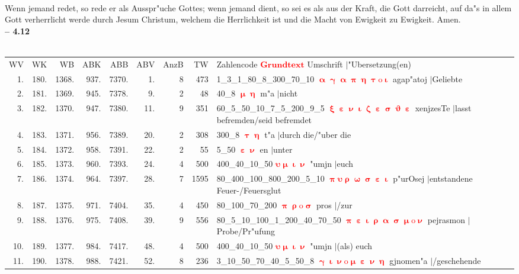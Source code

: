 \documentclass[a4paper,10pt,landscape]{article}
\begin{document}
\\
Wenn jemand redet, so rede er als Ausspr"uche Gottes; wenn jemand dient, so sei es als aus der Kraft, die Gott darreicht, auf da"s in allem Gott verherrlicht werde durch Jesum Christum, welchem die Herrlichkeit ist und die Macht von Ewigkeit zu Ewigkeit. Amen.\\
\newpage 
{\bf -- 4.12}\\
\medskip \\
\begin{tabular}{rrrrrrrrp{120mm}}
WV&WK&WB&ABK&ABB&ABV&AnzB&TW&Zahlencode \textcolor{red}{$\boldsymbol{Grundtext}$} Umschrift $|$"Ubersetzung(en)\\
1.&180.&1368.&937.&7370.&1.&8&473&1\_3\_1\_80\_8\_300\_70\_10 \textcolor{red}{$\boldsymbol{\upalpha\upgamma\upalpha\uppi\upeta\uptau\mathrm{o}\upiota}$} agap"atoj $|$Geliebte\\
2.&181.&1369.&945.&7378.&9.&2&48&40\_8 \textcolor{red}{$\boldsymbol{\upmu\upeta}$} m"a $|$nicht\\
3.&182.&1370.&947.&7380.&11.&9&351&60\_5\_50\_10\_7\_5\_200\_9\_5 \textcolor{red}{$\boldsymbol{\upxi\upepsilon\upnu\upiota\upzeta\upepsilon\upsigma\upvartheta\upepsilon}$} xenjzesTe $|$lasst befremden/seid befremdet\\
4.&183.&1371.&956.&7389.&20.&2&308&300\_8 \textcolor{red}{$\boldsymbol{\uptau\upeta}$} t"a $|$durch die/"uber die\\
5.&184.&1372.&958.&7391.&22.&2&55&5\_50 \textcolor{red}{$\boldsymbol{\upepsilon\upnu}$} en $|$unter\\
6.&185.&1373.&960.&7393.&24.&4&500&400\_40\_10\_50 \textcolor{red}{$\boldsymbol{\upsilon\upmu\upiota\upnu}$} "umjn $|$euch\\
7.&186.&1374.&964.&7397.&28.&7&1595&80\_400\_100\_800\_200\_5\_10 \textcolor{red}{$\boldsymbol{\uppi\upsilon\uprho\upomega\upsigma\upepsilon\upiota}$} p"urOsej $|$entstandene Feuer-/Feuersglut\\
8.&187.&1375.&971.&7404.&35.&4&450&80\_100\_70\_200 \textcolor{red}{$\boldsymbol{\uppi\uprho\mathrm{o}\upsigma}$} pros $|$/zur\\
9.&188.&1376.&975.&7408.&39.&9&556&80\_5\_10\_100\_1\_200\_40\_70\_50 \textcolor{red}{$\boldsymbol{\uppi\upepsilon\upiota\uprho\upalpha\upsigma\upmu\mathrm{o}\upnu}$} pejrasmon $|$Probe/Pr"ufung\\
10.&189.&1377.&984.&7417.&48.&4&500&400\_40\_10\_50 \textcolor{red}{$\boldsymbol{\upsilon\upmu\upiota\upnu}$} "umjn $|$(als) euch\\
11.&190.&1378.&988.&7421.&52.&8&236&3\_10\_50\_70\_40\_5\_50\_8 \textcolor{red}{$\boldsymbol{\upgamma\upiota\upnu\mathrm{o}\upmu\upepsilon\upnu\upeta}$} gjnomen"a $|$/geschehende\\

\end{tabular}
\end{document}
